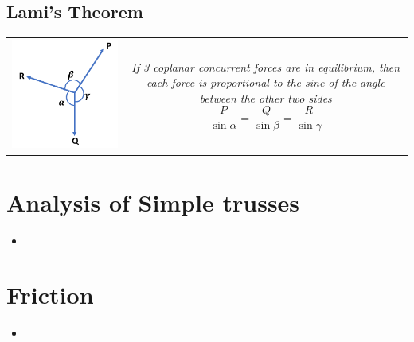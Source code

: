 \documentclass[8pt]{report}
\begin{document}
\section{Lami's Theorem}
	\begin{table}[H]
		\begin{tabular}{cc}
			\parbox{4cm}{\includegraphics[scale=0.4]{lamistheorem}} &
			\parbox{12cm}{\textit{If 3 coplanar concurrent forces are in equilibrium, then each force is proportional to the sine of the angle between the other two sides}\\$$\boxed{\dfrac{P}{\sin\alpha}=\dfrac{Q}{\sin\beta}=\dfrac{R}{\sin\gamma}}$$}
		\end{tabular}			
	\end{table}\hrulefill
\chapter{Analysis of Simple trusses}
	\begin{itemize}
		\item
	\end{itemize}
\chapter{Friction}
	\begin{itemize}
		\item
	\end{itemize}
\end{document}
